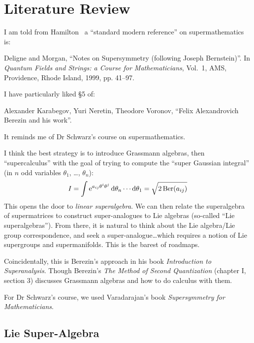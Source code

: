 \section{Literature Review}

I am told from Hamilton~ a ``standard modern
reference'' on supermathematics is:
\begin{enumerate}[label={[\arabic*]}]
\item Deligne and Morgan,
  ``Notes on Supersymmetry (following Joseph Bernstein)''.
  In \textit{Quantum Fields and Strings: a Course for Mathematicians}, Vol.~1, AMS, Providence, Rhode Island, 1999, pp. 41--97.
\end{enumerate}
I have particularly liked \S5 of:
\begin{enumerate}[resume,label={[\arabic*]}]
\item Alexander Karabegov, Yuri Neretin, Theodore Voronov,
  ``Felix Alexandrovich Berezin and his work''.
\end{enumerate}
It reminds me of Dr Schwarz's course on supermathematics.

I think the best strategy is to introduce Grassmann algebras, then
``supercalculus'' with the goal of trying to compute the ``super
Gaussian integral'' (in $n$ odd variables $\theta_{1}$, \dots, $\theta_{n}$):
\begin{equation}
I = \int\mathrm{e}^{a_{ij}\theta^{i}\theta^{j}}\,\mathrm{d}\theta_{n}\cdots\mathrm{d}\theta_{1}
= \sqrt{2\operatorname{Ber}(a_{ij})}
\end{equation}
This opens the door to \emph{linear superalgebra}. We can then relate
the superalgebra of supermatrices to construct super-analogues to Lie
algebras (so-called ``Lie superalgebras''). From there, it is natural to
think about the Lie algebra/Lie group correspondence, and seek a
super-analogue\dots which requires a notion of Lie supergroups and
supermanifolds. This is the barest of roadmaps.

Coincidentally, this is Berezin's approach in his book
\textit{Introduction to Superanalysis}. Though Berezin's
\textit{The Method of Second Quantization} (chapter I, section 3)
discusses Grassmann algebras and how to do calculus with them.

For Dr Schwarz's course, we used Varadarajan's book
\textit{Supersymmetry for Mathematicians}.

\subsection{Lie Super-Algebra}

